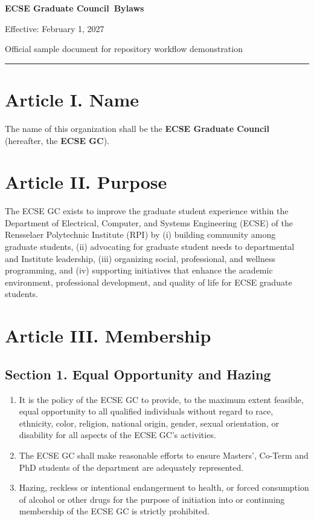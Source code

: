 \documentclass[11pt]{article}
\newcommand{\depname}{ECSE}
\newcommand{\orgname}{ECSE Graduate Council}
\newcommand{\orgshort}{ECSE GC}
\newcommand{\doctitle}{\orgname\ Bylaws}
\newcommand{\Article}[2]{\section*{Article #1. #2}}
\newcommand{\Sec}[1]{\subsection*{Section {#1}}}
\newcommand{\titlerulecustom}{%
  {\color{Rule}\rule{\textwidth}{1.2pt}}%
}
\begin{document}
\begin{center}
  {\huge\bfseries\color{Heading}\doctitle\par}
  \vspace{0.5em}
  {\normalsize Effective: February 1, 2027 \par}
  {\small Official sample document for repository workflow demonstration \par}
  \vspace{-0.2em}
  \titlerulecustom
\end{center}

\Article{I}{Name}
The name of this organization shall be the \textbf{\orgname} (hereafter, the \textbf{\orgshort}).

\Article{II}{Purpose}
The \orgshort{} exists to improve the graduate student experience within the Department of Electrical, Computer, and Systems Engineering (ECSE) of the Rensselaer Polytechnic Institute (RPI) by (i) building community among graduate students, (ii) advocating for graduate student needs to departmental and Institute leadership, (iii) organizing social, professional, and wellness programming, and (iv) supporting initiatives that enhance the academic environment, professional development, and quality of life for \depname{} graduate students.

\Article{III}{Membership}

\Sec{1. Equal Opportunity and Hazing}
\begin{enumerate}[label=\alph*)]
    \item It is the policy of the \orgshort{} to provide, to the maximum extent feasible, equal opportunity to all qualified individuals without regard to race, ethnicity, color, religion, national origin, gender, sexual orientation, or disability for all aspects of the \orgshort{}'s activities.
    \item The \orgshort{} shall make reasonable efforts to ensure Masters', Co-Term and PhD students of the department are adequately represented.
    \item Hazing, reckless or intentional endangerment to health, or forced consumption of alcohol or other drugs for the purpose of initiation into or continuing membership of the \orgshort{} is strictly prohibited.
\end{enumerate}
\end{document}
